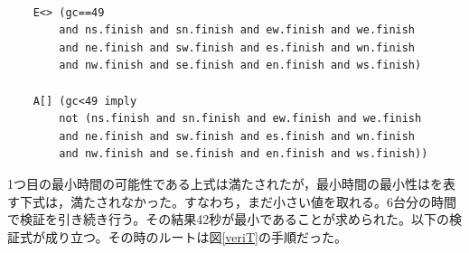 \documentclass{tpu-sotu}
\begin{document}
	\begin{verbatim}
	
	E<> (gc==49 
		and ns.finish and sn.finish and ew.finish and we.finish 
		and ne.finish and sw.finish and es.finish and wn.finish 
		and nw.finish and se.finish and en.finish and ws.finish)
	
	A[] (gc<49 imply 
		not (ns.finish and sn.finish and ew.finish and we.finish 
		and ne.finish and sw.finish and es.finish and wn.finish 
		and nw.finish and se.finish and en.finish and ws.finish))
	\end{verbatim}
	1つ目の最小時間の可能性である上式は満たされたが，最小時間の最小性はを表す下式は，満たされなかった。すなわち，まだ小さい値を取れる。6台分の時間で検証を引き続き行う。その結果42秒が最小であることが求められた。以下の検証式が成り立つ。その時のルートは図\ref{veriT}の手順だった。
	
\end{document}
